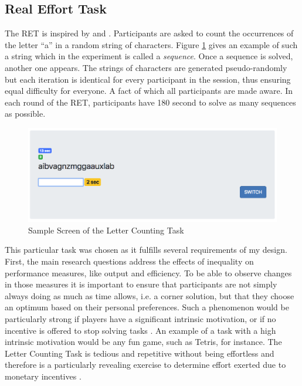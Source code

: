     
    \subsection{Real Effort Task}
    \label{sec:RET}
    
    The RET is inspired by \cite{rey-biel2016} and \cite{giusti2014}. Participants are asked to count the occurrences of the letter ``a'' in a random string of characters. Figure \ref{fig:LC_screen} gives an example of such a string which in the experiment is called a \textit{sequence}. Once a sequence is solved, another one appears. The strings of characters are generated pseudo-randomly but each iteration is identical for every participant in the session, thus ensuring equal difficulty for everyone. A fact of which all participants are made aware. In each round of the RET, participants have 180 second to solve as many sequences as possible.\\ 
    
    \begin{figure}[h]
        \centering
        \includegraphics[width=\textwidth]{graphs/screenshot_RET_alone.png}
        \caption{Sample Screen of the Letter Counting Task}
        \label{fig:LC_screen}
    \end{figure}
    
    This particular task was chosen as it fulfills several requirements of my design. First, the main research questions address the effects of inequality on performance measures, like output and efficiency. To be able to observe changes in those measures it is important to ensure that participants are not simply always doing as much as time allows, i.e. a corner solution, but that they choose an optimum based on their personal preferences. Such a phenomenon would be particularly strong if players have a significant intrinsic motivation, or if no incentive is offered to stop solving tasks \citep{frey1997}. An example of a task with a high intrinsic motivation would be any fun game, such as Tetris, for instance.
    The Letter Counting Task is tedious and repetitive without being effortless and therefore is a particularly revealing exercise to determine effort exerted due to monetary incentives \citep{cerasoli2014}.\\
    
